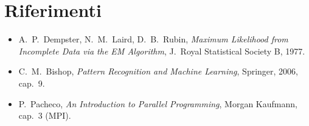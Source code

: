 \documentclass[11pt,a4paper]{article}
\theoremstyle{definition}
\begin{document}
\section*{Riferimenti}
\begin{itemize}
  \item A.~P.~Dempster, N.~M.~Laird, D.~B.~Rubin, \emph{Maximum Likelihood from
        Incomplete Data via the EM Algorithm}, J.\ Royal Statistical Society B, 1977.
  \item C.~M.~Bishop, \emph{Pattern Recognition and Machine Learning}, Springer, 2006, cap.~9.
  \item P.~Pacheco, \emph{An Introduction to Parallel Programming}, Morgan Kaufmann, cap.~3 (MPI).
\end{itemize}
\end{document}
